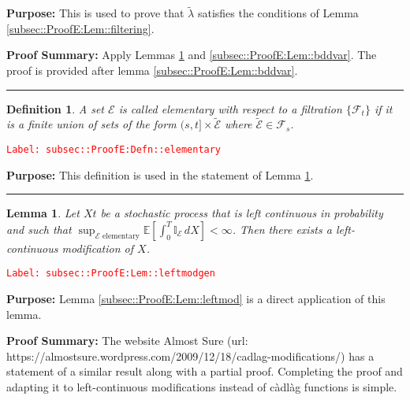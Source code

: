 \documentclass[12pt]{article}
\newcommand{\mb}{\mathbb}
\newcommand{\mc}{\mathcal}
\newcommand{\te}{\text}
\newcommand{\tr}{\textcolor{red}}
\newcommand{\labe}[1]{\tr{\texttt{Label: #1}}}
\newcommand{\purpose}{\textbf{Purpose: }}
\newcommand{\pfsum}{\textbf{Proof Summary: }}
\newcommand{\lin}{\rule{\linewidth}{0.4 pt}}
\newcommand{\ex}[1]{\mb{E}\left[#1\right]}			%
\newcommand{\T}{T}								%
\renewcommand{\t}{t}							%
\renewcommand{\tt}{s}							%
\newcommand{\F}{\mc{F}}							%
\newcommand{\X}{X}								%
\newcommand{\vsi}[1]{^{#1}}						%
\newcommand{\ts}[1]{_{#1}}						%
\newcommand{\alt}[1]{\widetilde{#1}}			%
\newcommand{\evnt}{\mc{E}}						%
\newcommand{\crate}{\alt{\lambda}}				%
\newtheorem{lem}[thms]{Lemma}
\newtheorem{defn}[thms]{Definition}
\begin{document}
\purpose This is used to prove that \(\crate{}{}\) satisfies the conditions of Lemma \ref{subsec::ProofE:Lem::filtering}.

\pfsum Apply Lemmas \ref{subsec::ProofE:Lem::leftmodgen} and \ref{subsec::ProofE:Lem::bddvar}. The proof is provided after lemma \ref{subsec::ProofE:Lem::bddvar}.

\lin

\begin{defn}
A set \(\evnt{}\) is called elementary with respect to a filtration \(\{\F\vsi{}\ts{\t}\}\) if it is a finite union of sets of the form \((\tt,\t]\times \alt{\evnt}\) where \(\alt{\evnt} \in \F\vsi{}\ts{\tt}\).
\label{subsec::ProofE:Defn::elementary}
\end{defn}
\labe{subsec::ProofE:Defn::elementary}

\purpose This definition is used in the statement of Lemma \ref{subsec::ProofE:Lem::leftmodgen}.

\lin

\begin{lem}
Let \(\X{}{\t}\) be a stochastic process that is left continuous in probability and such that \(\sup_{\evnt{}\te{ elementary}}\ex{\int_0^\T \mb{I}_\evnt{}\,d\X{}{}} < \infty\). Then there exists a left-continuous modification of \(\X{}{}\).
\label{subsec::ProofE:Lem::leftmodgen}
\end{lem}
\labe{subsec::ProofE:Lem::leftmodgen}

\purpose Lemma \ref{subsec::ProofE:Lem::leftmod} is a direct application of this lemma.

\pfsum The website Almost Sure (url: https://almostsure.wordpress.com/2009/12/18/cadlag-modifications/) has a statement of a similar result along with a partial proof. Completing the proof and adapting it to left-continuous modifications instead of c\`adl\`ag functions is simple.
\end{document}
